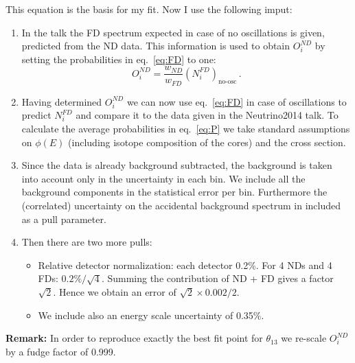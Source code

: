 \documentclass[12pt,oneside, a4paper]{article}
\begin{document}
\bigskip
This equation is the basis for my fit. Now I use the following imput:
\begin{enumerate}
\item In the talk the FD spectrum expected in case of no oscillations
  is given, predicted from the ND data. This information is used to obtain 
  $O_i^{ND}$ by setting the probabilities in eq.~\eqref{eq:FD} to one:
\begin{equation}
  O_i^{ND}  = \frac{w_{ND}}{w_{FD}}
  \left(N^{FD}_i\right)_\text{no-osc}\,.
\end{equation}
  
\item Having determined $O_i^{ND}$ we can now use eq.~\eqref{eq:FD} in
  case of oscillations to predict $N^{FD}_i$ and compare it to the
  data given in the Neutrino2014 talk. To calculate the average
  probabilities in eq.~\eqref{eq:P} we take standard assumptions on
  $\phi(E)$ (including isotope composition of the cores) and the cross section.

\item Since the data is already background subtracted, the background
  is taken into account only in the uncertainty in each bin. 
  We include all the background components in the statistical
  error per bin. Furthermore the (correlated) uncertainty
  on the accidental background spectrum in included as a pull parameter.

\item Then there are two more pulls: 
  \begin{itemize}
  \item 
  Relative detector normalization: each detector 0.2\%.
  For 4 NDs and 4 FDs: $0.2\% / \sqrt{4}$.   
  Summing the contribution of ND + FD gives a factor $\sqrt{2}$. Hence we obtain an error of
  $\sqrt{2} \times 0.002 / 2$. 
\item
We include also an energy scale uncertainty of 0.35\%.
  \end{itemize}
\end{enumerate}

{\bf Remark:} In order to reproduce exactly the best fit point for
$\theta_{13}$ we re-scale $O^{ND}_i$ by a fudge factor of 0.999.
\end{document}
